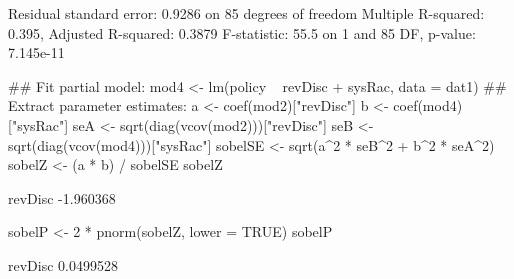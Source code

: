 \begin{Schunk}
\begin{Soutput}
Residual standard error: 0.9286 on 85 degrees of freedom
Multiple R-squared:  0.395,	Adjusted R-squared:  0.3879 
F-statistic:  55.5 on 1 and 85 DF,  p-value: 7.145e-11
\end{Soutput}
\begin{Sinput}
 ## Fit partial model:
 mod4 <- lm(policy ~ revDisc + sysRac, data = dat1)
 ## Extract parameter estimates:
 a <- coef(mod2)["revDisc"]
 b <- coef(mod4)["sysRac"]
 seA <- sqrt(diag(vcov(mod2)))["revDisc"]
 seB <- sqrt(diag(vcov(mod4)))["sysRac"]
 sobelSE <- sqrt(a^2 * seB^2 + b^2 * seA^2)
 sobelZ <- (a * b) / sobelSE
 sobelZ
\end{Sinput}
\begin{Soutput}
  revDisc 
-1.960368 
\end{Soutput}
\begin{Sinput}
 sobelP <- 2 * pnorm(sobelZ, lower = TRUE)
 sobelP
\end{Sinput}
\begin{Soutput}
  revDisc 
0.0499528 
\end{Soutput}
\end{Schunk}
